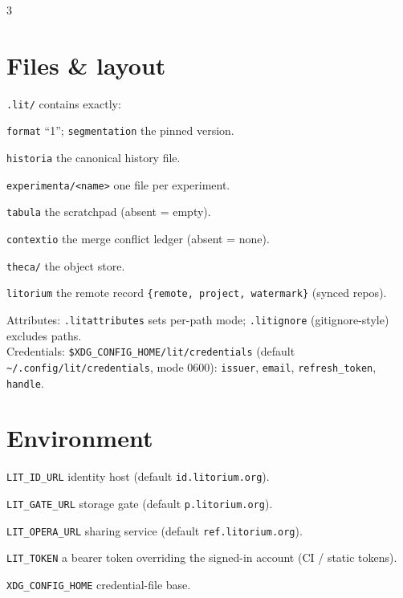 \documentclass[9pt]{extarticle}
\newcommand{\ci}[1]{\texttt{#1}}                       %
\begin{document}
\begin{multicols}{3}
\section{Files \& layout}
\ci{.lit/} contains exactly:
\begin{description}[leftmargin=1em,labelsep=0.4em,font=\normalfont]
\item[$\cdot$] \ci{format}\; ``1'';\quad
\ci{segmentation}\; the pinned version.
\item[$\cdot$] \ci{historia}\; the canonical history file.
\item[$\cdot$] \ci{experimenta/<name>}\; one file per
experiment.
\item[$\cdot$] \ci{tabula}\; the scratchpad (absent = empty).
\item[$\cdot$] \ci{contextio}\; the merge conflict ledger
(absent = none).
\item[$\cdot$] \ci{theca/}\; the object store.
\item[$\cdot$] \ci{litorium}\; the remote record
\ci{\{remote, project, watermark\}} (synced repos).
\end{description}
Attributes: \ci{.litattributes} sets per-path mode;
\ci{.litignore} (gitignore-style) excludes paths.\\
Credentials: \ci{\$XDG\_CONFIG\_HOME/lit/credentials} (default
\ci{\textasciitilde/.config/lit/credentials}, mode 0600):
\ci{issuer}, \ci{email}, \ci{refresh\_token}, \ci{handle}.

\section{Environment}
\begin{description}[leftmargin=1em,labelsep=0.4em,font=\normalfont]
\item[$\cdot$] \ci{LIT\_ID\_URL}\; identity host (default
\ci{id.litorium.org}).
\item[$\cdot$] \ci{LIT\_GATE\_URL}\; storage gate (default
\ci{p.litorium.org}).
\item[$\cdot$] \ci{LIT\_OPERA\_URL}\; sharing service (default
\ci{ref.litorium.org}).
\item[$\cdot$] \ci{LIT\_TOKEN}\; a bearer token overriding the
signed-in account (CI / static tokens).
\item[$\cdot$] \ci{XDG\_CONFIG\_HOME}\; credential-file base.
\end{description}


\end{multicols}
\end{document}
